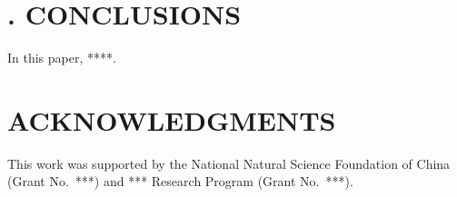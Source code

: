 \documentclass[a4paper,notitlepage,onecolumn,10pt]{article}
\begin{document}
\section{\textbf{. CONCLUSIONS}}\label{sec6}

In this paper, ****. 

\section{\textbf{ACKNOWLEDGMENTS}}\label{sec7}

This work was supported by the National Natural Science Foundation of China (Grant No.~***) and *** Research Program (Grant No.~***).

\renewcommand\refname{\textbf{REFERENCES}}


\end{document}
